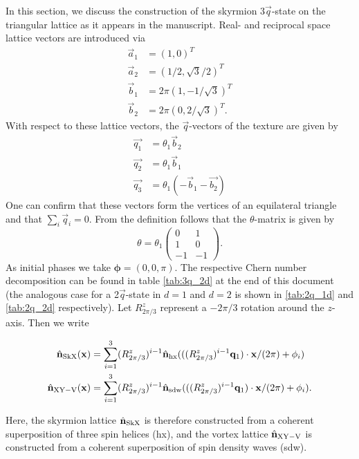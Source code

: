 \documentclass[
    10pt,
    aps,
    prb,
	longbibliography,
    twocolumn,
    floatfix,
    superscriptaddress,
]{revtex4-2}
\begin{document}
In this section, we discuss the construction of the skyrmion $3\vec{q}$-state on the triangular lattice as it appears in the manuscript.
Real- and reciprocal space lattice vectors are introduced via
\begin{align}
	\vec{a}_1 &= (1,0)^T
	\\
	\vec{a}_2 &= (1/2,\sqrt{3}/2 )^T
	\\
	\vec{b}_1 &= 2 \pi (1, -1/\sqrt{3})^T
	\\
	\vec{b}_2 &= 2 \pi (0, 2 / \sqrt{3})^T .
\end{align}
With respect to these lattice vectors, the $\vec{q}$-vectors of the texture are given by
\begin{align}
	\vec{q_1} &= \theta_1 \vec{b}_2 \\
	\vec{q_2} &= \theta_1\vec{b}_1 \\ 
	\vec{q_3} &= \theta_1(-\vec{b}_1- \vec{b_2}) 
\end{align}
One can confirm that these vectors form the vertices of an equilateral triangle and that $\sum_i \vec{q}_i = 0$.
From the definition follows that the $\theta$-matrix is given by
\begin{equation}
	\theta =
	\theta_1 
	\begin{pmatrix}
		0 & 1 \\
		1 & 0 \\
		-1 & -1
	\end{pmatrix} .
\end{equation}
As initial phases we take $\boldsymbol{\phi} = (0,0,\pi)$.  
The respective Chern number decomposition can be found in table \ref{tab:3q_2d} at the end of this document (the analogous case for a 2$\vec{q}$-state in $d=1$ and $d=2$ is shown in \ref{tab:2q_1d} and  \ref{tab:2q_2d} respectively).
Let $R^z_{2\pi/3}$ represent a $-2\pi/3$ rotation around the $z$-axis.
Then we write
\begin{widetext}
\begin{align}
	\hat{\mathbf{n}}_\mathrm{SkX}(\mathbf{x}) &=  \sum_{i=1}^{3 } (R^z_{2\pi/3})^{i-1} \hat{\mathbf{n}}_\mathrm{hx} ( ((R^z_{2\pi/3})^{i-1} \mathbf{q}_1 )\cdot \mathbf{x}/ (2\pi) + \phi_i ) 
	\\
	\hat{\mathbf{n}}_\mathrm{XY-V}(\mathbf{x}) &= \sum_{i=1}^{3 } (R^z_{2\pi/3})^{i-1} \hat{\mathbf{n}}_\mathrm{sdw} ( ((R^z_{2\pi/3})^{i-1} \mathbf{q}_1 )\cdot \mathbf{x}/ (2\pi)  + \phi_i ) .
\end{align}
\end{widetext}
Here, the skyrmion lattice $\hat{\mathbf{n}}_\mathrm{SkX}$ is therefore constructed from a coherent superposition of three spin helices (hx), and the vortex lattice $\hat{\mathbf{n}}_\mathrm{XY-V}$ is constructed  from a coherent superposition of spin density waves (sdw).
\end{document}
